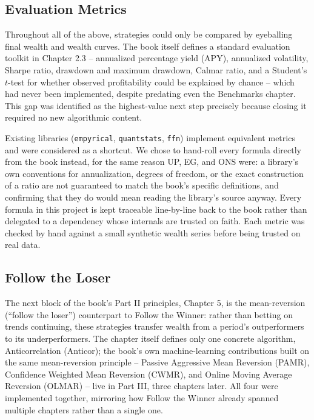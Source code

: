 \documentclass[11pt]{article}
\begin{document}
\subsection{Evaluation Metrics}

Throughout all of the above, strategies could only be compared by
eyeballing final wealth and wealth curves. The book itself defines a
standard evaluation toolkit in Chapter 2.3 -- annualized percentage yield
(APY), annualized volatility, Sharpe ratio, drawdown and maximum drawdown,
Calmar ratio, and a Student's $t$-test for whether observed profitability
could be explained by chance -- which had never been implemented, despite
predating even the Benchmarks chapter. This gap was identified as the
highest-value next step precisely because closing it required no new
algorithmic content.

Existing libraries (\texttt{empyrical}, \texttt{quantstats}, \texttt{ffn})
implement equivalent metrics and were considered as a shortcut. We chose
to hand-roll every formula directly from the book instead, for the same
reason UP, EG, and ONS were: a library's own conventions for annualization,
degrees of freedom, or the exact construction of a ratio are not guaranteed
to match the book's specific definitions, and confirming that they do
would mean reading the library's source anyway. Every formula in this
project is kept traceable line-by-line back to the book rather than
delegated to a dependency whose internals are trusted on faith. Each metric
was checked by hand against a small synthetic wealth series before being
trusted on real data.

\subsection{Follow the Loser}
\label{sec:ftl}

The next block of the book's Part II principles, Chapter 5, is the
mean-reversion (``follow the loser'') counterpart to Follow the Winner:
rather than betting on trends continuing, these strategies transfer
wealth from a period's outperformers to its underperformers. The chapter
itself defines only one concrete algorithm, Anticorrelation (Anticor);
the book's own machine-learning contributions built on the same
mean-reversion principle -- Passive Aggressive Mean Reversion (PAMR),
Confidence Weighted Mean Reversion (CWMR), and Online Moving Average
Reversion (OLMAR) -- live in Part III, three chapters later. All four
were implemented together, mirroring how Follow the Winner already
spanned multiple chapters rather than a single one.
\end{document}
